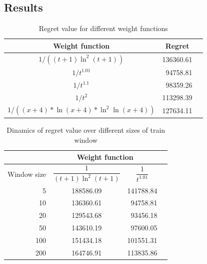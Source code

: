 \documentclass[12pt, twoside]{article}
\begin{document}
\subsection{Results}


\begin{table}[h]
\centering

\begin{tabular}{ccr}

\toprule
Weight function & Regret \\
\midrule
$1 / ((t+1)\ln^2(t+1))$   & 136360.61 \\
$1 / t^{1.01}$  &\ 94758.81 \\
 $1 / t^{1.1}$&\ 98359.26 \\
$1 / t^{2}$ & 113298.39 \\
$1 / ((x + 4) * \ln(x + 4) * \ln^2\ln(x + 4)) $  & 127634.11 \\
\bottomrule
\end{tabular}
\caption{Regret value for different weight functions} \hspace{16cm}
\end{table}


\begin{table}[h]
\centering
\begin{tabular}{r|ccc}
 &
\multicolumn{2}{c}{Weight function} \\
\toprule {Window size}  &

\centering $\dfrac{1}{(t+1)\ln^2(t+1)}$ &
\centering $\dfrac1{t^{1.01}}$  & \tabularnewline

\midrule
5 &  188586.09 & 141788.84 \\ %
10 &  136360.61 &\ 94758.81 \\ %
20 &  129543.68 &\ 93456.18 \\ %
50 &  143610.19 &\ 97600.05 \\ %
100 & 151434.18 & 101551.31 \\ %
200 & 164746.91 & 113835.86 \\ %
\bottomrule
\end{tabular}
\caption{Dinamics of regret value over different sizes of train window} \hspace{16cm}

\end{table}
\end{document}
